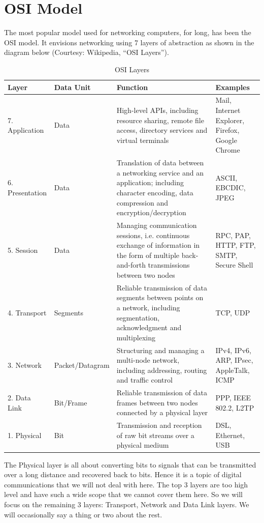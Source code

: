 \chapter{OSI Model}
The most popular model used for networking computers, for long, has been the OSI model. It envisions networking using 7 layers of abstraction as shown in the diagram below (Courtesy: Wikipedia, ``OSI Layers'').

	\begin{table}[h] 
	\centerfloat
	\begin{tabular}{l l p{} p{}}
	\toprule
	Layer & Data Unit & Function & Examples \\
	\midrule
	7. Application & Data & {\footnotesize High-level APIs, including resource sharing, remote file access, directory services and virtual terminals} & Mail, Internet Explorer, Firefox, Google Chrome \\
	6. Presentation & Data & {\footnotesize Translation of data between a networking service and an application; including character encoding, data compression and encryption/decryption} & ASCII, EBCDIC, JPEG\\
	5. Session & Data & {\footnotesize Managing communication sessions, i.e. continuous exchange of information in the form of multiple back-and-forth transmissions between two nodes} & RPC, PAP, HTTP, FTP, SMTP, Secure Shell\\
	4. Transport & Segments & {\footnotesize Reliable transmission of data segments between points on a network, including segmentation, acknowledgment and multiplexing} & TCP, UDP\\
	3. Network & Packet/Datagram & {\footnotesize Structuring and managing a multi-node network, including addressing, routing and traffic control} & IPv4, IPv6, ARP, IPsec, AppleTalk, ICMP\\
	2. Data Link & Bit/Frame & {\footnotesize Reliable transmission of data frames between two nodes connected by a physical layer} & PPP, IEEE 802.2, L2TP\\
	1. Physical & Bit & {\footnotesize Transmission and reception of raw bit streams over a physical medium} & DSL, Ethernet, USB\\
		
	\bottomrule
	\end{tabular}
	\caption{OSI Layers}
	\end{table}

The Physical layer is all about converting bits to signals that can be transmitted over a long distance and recovered back to bits. Hence it is a topic of digital communications that we will not deal with here. The top 3 layers are too high level and have such a wide scope that we cannot cover them here. So we will focus on the remaining 3 layers: Transport, Network and Data Link layers. We will occasionally say a thing or two about the rest.

